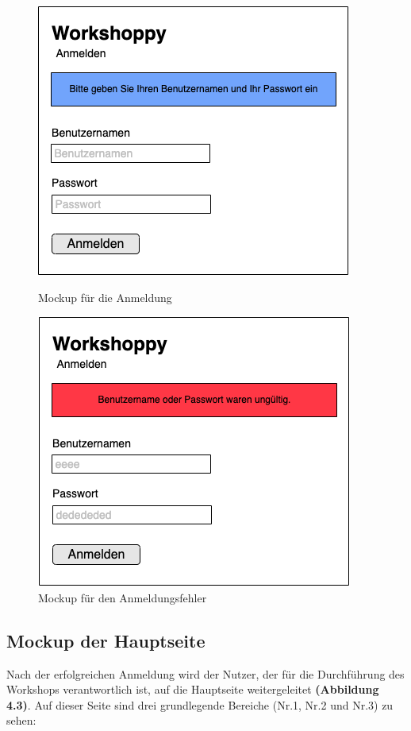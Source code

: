 \begin{figure}[H]
	\centering
  \begin{minipage}[t]{0.45\linewidth}
  	    \includegraphics[width=.75\linewidth]{img/willkommenseite1}
		\caption{Mockup für die Anmeldung}
		\label{fig:mockup für die anmeldung}
  \end{minipage}
\hfill
  \begin{minipage}[t]{0.45\linewidth}
    	    \includegraphics[width=.75\linewidth]{img/willkommenseite2}
		\caption{Mockup für den Anmeldungsfehler}
		\label{fig:mockup für die anmeldungsfehler}
  \end{minipage}
\end{figure}

\newpage
\subsection{Mockup der Hauptseite}
\label{subsec:mockup der hauptseite}
Nach der erfolgreichen Anmeldung wird der Nutzer, der für die Durchführung des Workshops verantwortlich ist, auf die Hauptseite weitergeleitet \textbf{(Abbildung 4.3)}. Auf dieser Seite sind drei grundlegende Bereiche (Nr.1, Nr.2 und Nr.3) zu sehen:\bigskip

